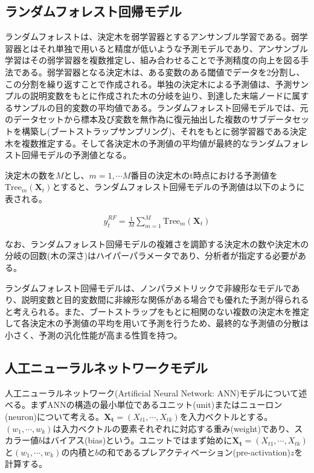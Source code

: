 \documentclass[a4paper, 12pt]{jsreport}
\begin{document}
\subsection{ランダムフォレスト回帰モデル}

ランダムフォレスト\citep{breiman2001random}は、決定木を弱学習器とするアンサンブル学習である。弱学習器とはそれ単独で用いると精度が低いような予測モデルであり、アンサンブル学習はその弱学習器を複数推定し、組み合わせることで予測精度の向上を図る手法である。弱学習器となる決定木は、ある変数のある閾値でデータを2分割し、この分割を繰り返すことで作成される。単独の決定木による予測値は、予測サンプルの説明変数をもとに作成された木の分岐を辿り、到達した末端ノードに属するサンプルの目的変数の平均値である。ランダムフォレスト回帰モデルでは、元のデータセットから標本及び変数を無作為に復元抽出した複数のサブデータセットを構築し(ブートストラップサンプリング)、それをもとに弱学習器である決定木を複数推定する。そして各決定木の予測値の平均値が最終的なランダムフォレスト回帰モデルの予測値となる。


決定木の数を$M$とし、$m=1, \cdots M$番目の決定木のt時点における予測値を$\text{Tree}_m(\bm{X}_t)$とすると、ランダムフォレスト回帰モデルの予測値は以下のように表される。

\begin{equation}
  \begin{split}
    \hat{y}_t^{RF} = \frac{1}{M} \sum_{m=1}^{M} \text{Tree}_m(\bm{X}_t)
  \end{split}
\end{equation}

なお、ランダムフォレスト回帰モデルの複雑さを調節する決定木の数や決定木の分岐の回数(木の深さ)はハイパーパラメータであり、分析者が指定する必要がある。

ランダムフォレスト回帰モデルは、ノンパラメトリックで非線形なモデルであり、説明変数と目的変数間に非線形な関係がある場合でも優れた予測が得られると考えられる。また、ブートストラップをもとに相関のない複数の決定木を推定して各決定木の予測値の平均を用いて予測を行うため、最終的な予測値の分散は小さく、予測の汎化性能が高まる性質を持つ。

\subsection{人工ニューラルネットワークモデル}

人工ニューラルネットワーク(Artificial Neural Network: ANN)モデルについて述べる。まずANNの構造の最小単位であるユニット(unit)またはニューロン(neuron)について考える。$\bm{X_t}=(X_{t1}, \cdots, X_{tk})$を入力ベクトルとする。$(w_1, \cdots, w_k)$は入力ベクトルの要素それぞれに対応する重み(weight)であり、スカラー値$b$はバイアス(bias)という。ユニットではまず始めに$\bm{X_t}=(X_{t1}, \cdots, X_{tk})$と$(w_1, \cdots, w_k)$の内積と$b$の和であるプレアクティベーション(pre-activation)$z$を計算する。
\end{document}
